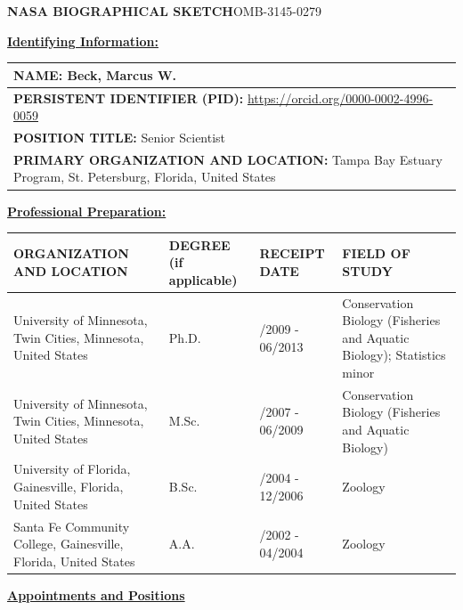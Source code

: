 \documentclass[letterpaper,11pt]{article}
\newcommand{\sechead}[1]{\vspace{6pt}\noindent\underline{\textbf{#1}}\vspace{2pt}\par}
\begin{document}
\hfill{\textbf{NASA BIOGRAPHICAL SKETCH}}\hfill{\footnotesize OMB-3145-0279}\par

\sechead{Identifying Information:}

\begin{tabular}{@{}p{6.5in}@{}}
\hline
\textbf{NAME:} Beck, Marcus W. \\
\hline
\textbf{PERSISTENT IDENTIFIER (PID):} \url{https://orcid.org/0000-0002-4996-0059} \\
\hline
\textbf{POSITION TITLE:} Senior Scientist \\
\hline
\textbf{PRIMARY ORGANIZATION AND LOCATION:} Tampa Bay Estuary Program, St. Petersburg, Florida, United States \\
\hline
\end{tabular}

\sechead{Professional Preparation:}

\renewcommand{\arraystretch}{1.5}
\begin{center}
\begin{tabular}{>{\centering\arraybackslash}p{2.3in}|>{\centering\arraybackslash}p{0.95in}|>{\centering\arraybackslash}p{1.1in}|>{\centering\arraybackslash}p{1.65in}}
\hline
\footnotesize ORGANIZATION AND LOCATION & \footnotesize DEGREE \newline\footnotesize(if applicable) & \footnotesize RECEIPT DATE & \footnotesize FIELD OF STUDY \tabularnewline
\hline
University of Minnesota, Twin Cities, Minnesota, United States & Ph.D. & 08/2009 - 06/2013 & Conservation Biology (Fisheries and Aquatic Biology); Statistics minor \tabularnewline
University of Minnesota, Twin Cities, Minnesota, United States & M.Sc. & 08/2007 - 06/2009 & Conservation Biology (Fisheries and Aquatic Biology) \tabularnewline
University of Florida, Gainesville, Florida, United States & B.Sc. & 08/2004 - 12/2006 & Zoology \tabularnewline
Santa Fe Community College, Gainesville, Florida, United States & A.A. & 08/2002 - 04/2004 & Zoology \tabularnewline
\end{tabular}
\end{center}
\renewcommand{\arraystretch}{1}

\sechead{Appointments and Positions}
\end{document}
